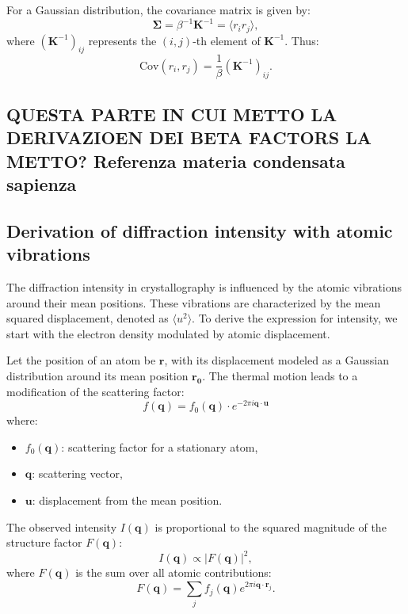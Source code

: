 \documentclass[English, Lau, oneside]{sapthesis}
\begin{document}
For a Gaussian distribution, the covariance matrix is given by:
\begin{equation}
    \bm{\Sigma} = \beta^{-1} \mathbf{K}^{-1} = \langle r_i r_j \rangle,
\end{equation}
where \((\mathbf{K}^{-1})_{ij}\) represents the \((i,j)\)-th element of \(\mathbf{K}^{-1}\). Thus:
\begin{equation}
    \text{Cov}(r_i, r_j) = \frac{1}{\beta} (\mathbf{K}^{-1})_{ij}.
\end{equation}



\subsection{QUESTA PARTE IN CUI METTO LA DERIVAZIOEN DEI BETA FACTORS LA METTO? Referenza materia condensata sapienza}
\subsection{Derivation of diffraction intensity with atomic vibrations}
\noindent The diffraction intensity in crystallography is influenced by the atomic vibrations around their mean positions. These vibrations are characterized by the mean squared displacement, denoted as $\langle u^2 \rangle$. To derive the expression for intensity, we start with the electron density modulated by atomic displacement.

Let the position of an atom be $\mathbf{r}$, with its displacement modeled as a Gaussian distribution around its mean position $\mathbf{r_0}$. The thermal motion leads to a modification of the scattering factor:
\[
f(\mathbf{q}) = f_0(\mathbf{q}) \cdot e^{-2\pi i \mathbf{q} \cdot \mathbf{u}}
\]
where:
\begin{itemize}
    \item $f_0(\mathbf{q})$: scattering factor for a stationary atom,
    \item $\mathbf{q}$: scattering vector,
    \item $\mathbf{u}$: displacement from the mean position.
\end{itemize}

The observed intensity $I(\mathbf{q})$ is proportional to the squared magnitude of the structure factor $F(\mathbf{q})$:
\[
I(\mathbf{q}) \propto |F(\mathbf{q})|^2,
\]
where $F(\mathbf{q})$ is the sum over all atomic contributions:
\[
F(\mathbf{q}) = \sum_j f_j(\mathbf{q}) e^{2\pi i \mathbf{q} \cdot \mathbf{r}_j}.
\]
\end{document}
